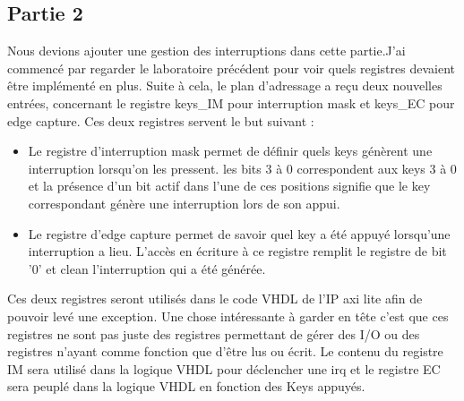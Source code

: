 \subsection{Partie 2}
Nous devions ajouter une gestion des interruptions dans cette partie.J'ai commencé par regarder le laboratoire précédent pour voir quels registres devaient être implémenté en plus. Suite à cela, le plan d'adressage a reçu deux nouvelles entrées, concernant le registre keys\_IM pour interruption mask et keys\_EC pour edge capture. Ces deux registres servent le but suivant :\\ 
\begin{itemize}
	\item Le registre d'interruption mask permet de définir quels keys génèrent une interruption lorsqu'on les pressent. les bits 3 à 0 correspondent aux keys 3 à 0 et la présence d'un bit actif dans l'une de ces positions signifie que le key correspondant génère une interruption lors de son appui.\\
	\item Le registre d'edge capture permet de savoir quel key a été appuyé lorsqu'une interruption a lieu. L'accès en écriture à ce registre remplit le registre de bit '0' et clean l'interruption qui a été générée. \\ 
\end{itemize}
Ces deux registres seront utilisés dans le code VHDL de l'IP axi lite afin de pouvoir levé une exception. Une chose intéressante à garder en tête c'est que ces registres ne sont pas juste des registres permettant de gérer des I/O ou des registres n'ayant comme fonction que d'être lus ou écrit. Le contenu du registre IM sera utilisé dans la logique VHDL pour déclencher une irq et le registre EC sera peuplé dans la logique VHDL en fonction des Keys appuyés.

